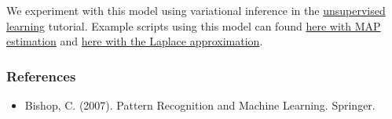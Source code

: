We experiment with this model using variational inference in the
\href{tut_unsupervised}{unsupervised learning} tutorial.
Example scripts using this model can found
\href{https://github.com/blei-lab/edward/blob/master/examples/mixture_gaussian_map.py}
{here with MAP estimation} and
\href{https://github.com/blei-lab/edward/blob/master/examples/mixture_gaussian_laplace.py}
{here with the Laplace approximation}.

\subsubsection{References}\label{references}

\begin{itemize}
\item
  Bishop, C. (2007). Pattern Recognition and Machine Learning. Springer.
\end{itemize}
